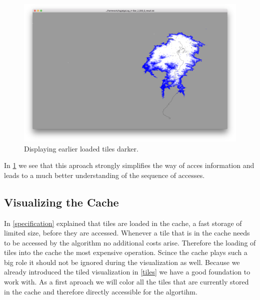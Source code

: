 \documentclass
[
	paper = a4,
    pagesize,
	12 pt,
	oneside,                       %
    open = right,
	DIV = calc,
	BCOR = 0 mm,                   %
	bibtotoc
]
{scrbook}
\begin{document}
\begin{figure}[H]
	\includegraphics[width=\textwidth]{Images/vis-aged-coloring.png}
\caption[]{Displaying earlier loaded tiles darker.}
\label{fig:color_aged_tile}
\end{figure}


In \cref{fig:color_aged_tile} we see that this aproach strongly simplifies the way of acces information and leads to a much better understanding of the sequence of accesses.


\subsection{Visualizing the Cache}

In \cref{specification} explained that tiles are loaded in the cache, a fast storage
of limited size, before they are accessed.
Whenever a tile that is in the cache needs to be accessed by the algorithm no additional costs arise.
Therefore the loading of tiles into the cache the most expensive operation.
Scince the cache plays such a big role it should not be ignored during the visualization as well.
Because we already introduced the tiled visualization in \cref{tiles} we have a good foundation to work with.
As a first aproach we will color all the tiles that are currently stored in the cache and therefore directly accessible for the algortihm.
\end{document}
